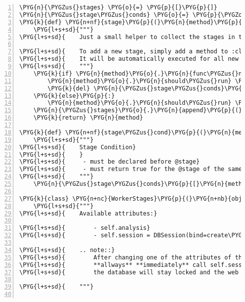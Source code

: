 \begin{Verbatim}[commandchars=\\\{\},numbers=left,firstnumber=1,stepnumber=5]
\PYG{n}{\PYGZus{}stages} \PYG{o}{=} \PYG{p}{[}\PYG{p}{]}
\PYG{n}{\PYGZus{}stage\PYGZus{}conds} \PYG{o}{=} \PYG{p}{\PYGZob{}}\PYG{p}{\PYGZcb{}}
\PYG{k}{def} \PYG{n+nf}{stage}\PYG{p}{(}\PYG{n}{method}\PYG{p}{)}\PYG{p}{:}
    \PYG{l+s+sd}{"""}
\PYG{l+s+sd}{    Just a small helper to collect the stages in the order defined.}

\PYG{l+s+sd}{    To add a new stage, simply add a method to :class:{}`\PYGZti{}WorkerStages{}`.}
\PYG{l+s+sd}{    It will be automatically executed for all new analyses.}
\PYG{l+s+sd}{    """}
    \PYG{k}{if} \PYG{n}{method}\PYG{o}{.}\PYG{n}{func\PYGZus{}name} \PYG{o+ow}{in} \PYG{n}{\PYGZus{}stage\PYGZus{}conds}\PYG{p}{:}
        \PYG{n}{method}\PYG{o}{.}\PYG{n}{should\PYGZus{}run} \PYG{o}{=} \PYG{n}{\PYGZus{}stage\PYGZus{}conds}\PYG{p}{[}\PYG{n}{method}\PYG{o}{.}\PYG{n}{func\PYGZus{}name}\PYG{p}{]}
        \PYG{k}{del} \PYG{n}{\PYGZus{}stage\PYGZus{}conds}\PYG{p}{[}\PYG{n}{method}\PYG{o}{.}\PYG{n}{func\PYGZus{}name}\PYG{p}{]}
    \PYG{k}{else}\PYG{p}{:}
        \PYG{n}{method}\PYG{o}{.}\PYG{n}{should\PYGZus{}run} \PYG{o}{=} \PYG{k}{lambda} \PYG{n+nb+bp}{self}\PYG{p}{:} \PYG{n+nb+bp}{True}
    \PYG{n}{\PYGZus{}stages}\PYG{o}{.}\PYG{n}{append}\PYG{p}{(}\PYG{n}{method}\PYG{p}{)}
    \PYG{k}{return} \PYG{n}{method}

\PYG{k}{def} \PYG{n+nf}{stage\PYGZus{}cond}\PYG{p}{(}\PYG{n}{method}\PYG{p}{)}\PYG{p}{:}
    \PYG{l+s+sd}{"""}
\PYG{l+s+sd}{    Stage Condition}
\PYG{l+s+sd}{    }
\PYG{l+s+sd}{     - must be declared before @stage}
\PYG{l+s+sd}{     - must return true for the @stage of the same name to run}
\PYG{l+s+sd}{    """}
    \PYG{n}{\PYGZus{}stage\PYGZus{}conds}\PYG{p}{[}\PYG{n}{method}\PYG{o}{.}\PYG{n}{func\PYGZus{}name}\PYG{p}{]} \PYG{o}{=} \PYG{n}{method}

\PYG{k}{class} \PYG{n+nc}{WorkerStages}\PYG{p}{(}\PYG{n+nb}{object}\PYG{p}{)}\PYG{p}{:}
    \PYG{l+s+sd}{"""}
\PYG{l+s+sd}{    Available attributes:}

\PYG{l+s+sd}{        - self.analysis}
\PYG{l+s+sd}{        - self.session = DBSession(bind=create\PYGZus{}engine(rnaseqlyze.db\PYGZus{}url))}

\PYG{l+s+sd}{    .. note::}
\PYG{l+s+sd}{        After changing one of the attributes of the self.analysis object,}
\PYG{l+s+sd}{        **allways** **immediately** call self.session.commit(). Otherwise}
\PYG{l+s+sd}{        the database will stay locked and the web frontend can't update the ui.}

\PYG{l+s+sd}{    """}


\end{Verbatim}
